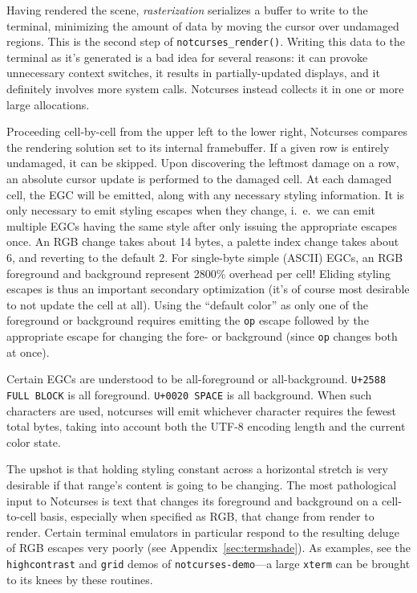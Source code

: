 \documentclass[letterpaper,10pt]{article}
\begin{document}
Having rendered the scene, \textit{rasterization} serializes a buffer to write
to the terminal, minimizing the amount of data by moving the cursor over undamaged
regions. This is the second step of \texttt{notcurses\_render()}. Writing this
data to the terminal as it's generated is a bad idea for several reasons: it can
provoke unnecessary context switches, it results in partially-updated displays,
and it definitely involves more system calls. Notcurses instead collects it in
one or more large allocations.

Proceeding cell-by-cell from the upper left to the lower right, Notcurses
compares the rendering solution set to its internal framebuffer. If a given row
is entirely undamaged, it can be skipped. Upon discovering the leftmost damage
on a row, an absolute cursor update is performed to the damaged cell. At each
damaged cell, the EGC will be emitted, along with any necessary styling
information. It is only necessary to emit styling escapes when they change, i.\ e.\ we
can emit multiple EGCs having the same style after only issuing the appropriate
escapes once. An RGB change takes about 14 bytes, a palette index change
takes about 6, and reverting to the default 2. For single-byte simple (ASCII)
EGCs, an RGB foreground and background represent 2800\% overhead per cell!
Eliding styling escapes is thus an important secondary optimization (it's of
course most desirable to not update the cell at all). Using the ``default
color'' as only one of the foreground or background requires emitting the
\texttt{op} escape followed by the appropriate escape for changing the fore- or
background (since \texttt{op} changes both at once).

Certain EGCs are understood to be all-foreground or all-background.
\texttt{U+2588 FULL BLOCK} is all foreground. \texttt{U+0020 SPACE} is all
background. When such characters are used, notcurses will emit whichever
character requires the fewest total bytes, taking into account both the
UTF-8 encoding length and the current color state.

The upshot is that holding styling constant across a horizontal stretch is
very desirable if that range's content is going to be changing. The most
pathological input to Notcurses is text that changes its foreground and background
on a cell-to-cell basis, especially when specified as RGB, that change from
render to render. Certain terminal emulators in particular respond to the
resulting deluge of RGB escapes very poorly (see Appendix~\ref{sec:termshade}).
As examples, see the \texttt{highcontrast} and \texttt{grid} demos of
\texttt{notcurses-demo}---a large \texttt{xterm} can be brought to its knees
by these routines.
\end{document}
